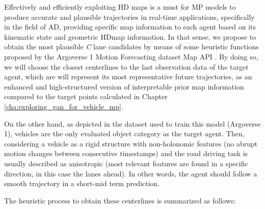 Effectively and efficiently exploiting HD maps is a must for \ac{MP} models to produce accurate and plausible trajectories in real-time applications, specifically in the field of \ac{AD}, providing specific map information to each agent based on its kinematic state and geometric \ac{HDmap} information. In that sense, we propose to obtain the most plausible \textit{C} lane candidates by means of some heuristic functions proposed by the Argoverse 1 Motion Forecasting dataset Map \ac{API} \cite{chang2019argoverse, khandelwal2020if}. By doing so, we will choose the closest centerlines to the last observation data of the target agent, which are will represent its most representative future trajectories, as an enhanced and high-structured version of interpretable prior map information compared to the target points calculated in Chapter \ref{cha:exploring_gan_for_vehicle_mp}.

On the other hand, as depicted in the dataset used to train this model (Argoverse 1), vehicles are the only evaluated object category as the target agent. Then, considering a vehicle as a rigid structure with non-holonomic \cite{triggs1993motion} features (no abrupt motion changes between consecutive timestamps) and the road driving task is usually described as anisotropic \cite{ross1989planning} (most relevant features are found in a specific direction, in this case the lanes ahead). In other words, the agent should follow a smooth trajectory in a short-mid term prediction. 

The heuristic process to obtain these centerlines is summarized as follows:

